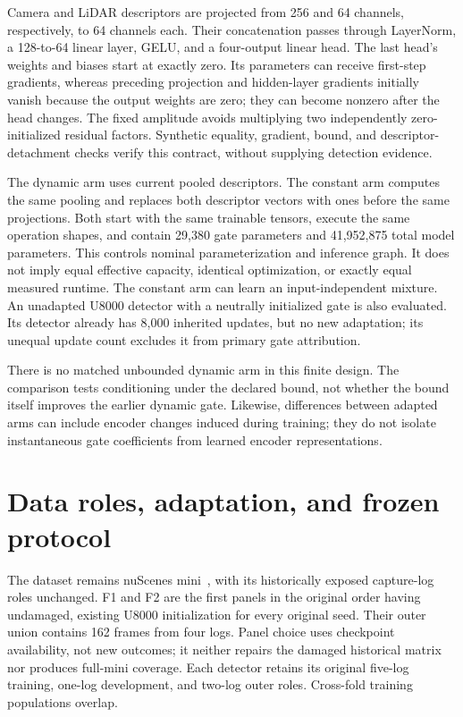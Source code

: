 Camera and LiDAR descriptors are projected from 256 and 64 channels, respectively, to 64 channels each. Their concatenation passes through LayerNorm, a 128-to-64 linear layer, GELU, and a four-output linear head. The last head's weights and biases start at exactly zero. Its parameters can receive first-step gradients, whereas preceding projection and hidden-layer gradients initially vanish because the output weights are zero; they can become nonzero after the head changes. The fixed amplitude avoids multiplying two independently zero-initialized residual factors. Synthetic equality, gradient, bound, and descriptor-detachment checks verify this contract, without supplying detection evidence.

The dynamic arm uses current pooled descriptors. The constant arm computes the same pooling and replaces both descriptor vectors with ones before the same projections. Both start with the same trainable tensors, execute the same operation shapes, and contain 29,380 gate parameters and 41,952,875 total model parameters. This controls nominal parameterization and inference graph. It does not imply equal effective capacity, identical optimization, or exactly equal measured runtime. The constant arm can learn an input-independent mixture. An unadapted U8000 detector with a neutrally initialized gate is also evaluated. Its detector already has 8,000 inherited updates, but no new adaptation; its unequal update count excludes it from primary gate attribution.

There is no matched unbounded dynamic arm in this finite design. The comparison tests conditioning under the declared bound, not whether the bound itself improves the earlier dynamic gate. Likewise, differences between adapted arms can include encoder changes induced during training; they do not isolate instantaneous gate coefficients from learned encoder representations.

\section{Data roles, adaptation, and frozen protocol}
The dataset remains nuScenes mini~\cite{Caesar2020nuScenes}, with its historically exposed capture-log roles unchanged. F1 and F2 are the first panels in the original order having undamaged, existing U8000 initialization for every original seed. Their outer union contains 162 frames from four logs. Panel choice uses checkpoint availability, not new outcomes; it neither repairs the damaged historical matrix nor produces full-mini coverage. Each detector retains its original five-log training, one-log development, and two-log outer roles. Cross-fold training populations overlap.

